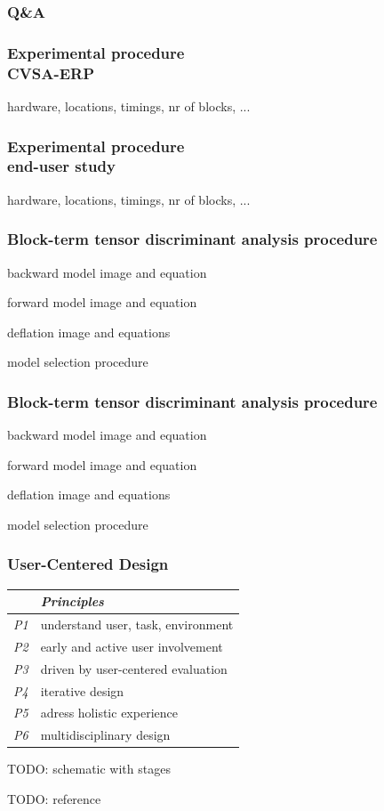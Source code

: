 \documentclass{kul-ulille-beamer}
\begin{document}
\begin{frame}
  \frametitle{Q\&A}
  \centering
\end{frame}
%



\begin{frame}
  \frametitle{Experimental procedure \\ CVSA-ERP}
  hardware, locations, timings, nr of blocks, ...
\end{frame}
\begin{frame}
  \frametitle{Experimental procedure \\ end-user study}
  hardware, locations, timings, nr of blocks, ...
\end{frame}

\begin{frame}
  \frametitle{Block-term tensor discriminant analysis procedure}
  backward model image and equation

  forward model image and equation

  deflation image and equations

  model selection procedure
\end{frame}

\begin{frame}
  \frametitle{Block-term tensor discriminant analysis procedure}
  backward model image and equation

  forward model image and equation

  deflation image and equations

  model selection procedure
\end{frame}



\begin{frame}[c]
\frametitle{User-Centered Design}

  \begin{minipage}[c]{.5\textwidth}
  \begin{tabular}{|l|l|}
    \hline
     & \emph{Principles} \\ \hline
     \emph{P1} & understand user, task, environment \\
     \emph{P2} & early and active user involvement \\
     \emph{P3} & driven by user-centered evaluation \\
     \emph{P4} & iterative design \\
     \emph{P5} & adress holistic experience \\
     \emph{P6} & multidisciplinary design \\
    \hline
  \end{tabular}
  \end{minipage}\hfill%
  \begin{minipage}[c]{.4\textwidth}
      TODO: schematic with stages

      TODO: reference
  \end{minipage}

\end{frame}
\end{document}
